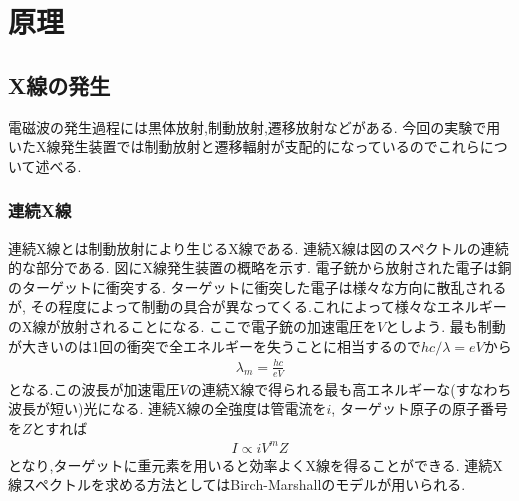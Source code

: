 \section{原理}
\subsection{X線の発生}
電磁波の発生過程には黒体放射,制動放射,遷移放射などがある.
今回の実験で用いたX線発生装置では制動放射と遷移輻射が支配的になっているのでこれらについて述べる.
\subsubsection{連続X線}
連続X線とは制動放射により生じるX線である.
連続X線は図のスペクトルの連続的な部分である.
図にX線発生装置の概略を示す.
電子銃から放射された電子は銅のターゲットに衝突する.
ターゲットに衝突した電子は様々な方向に散乱されるが,
その程度によって制動の具合が異なってくる.これによって様々なエネルギーのX線が放射されることになる.
ここで電子銃の加速電圧を$V$としよう.
最も制動が大きいのは1回の衝突で全エネルギーを失うことに相当するので$hc/\lambda=eV$から
\begin{align}
  \lambda_{m}=\frac{hc}{eV}
\end{align}
となる.この波長が加速電圧$V$の連続X線で得られる最も高エネルギーな(すなわち波長が短い)光になる.
連続X線の全強度は管電流を$i$, ターゲット原子の原子番号を$Z$とすれば
\begin{align}
  I\propto iV^mZ
\end{align}
となり,ターゲットに重元素を用いると効率よくX線を得ることができる.\cite{XrayS}
連続X線スペクトルを求める方法としてはBirch-Marshallのモデルが用いられる.\cite{Xraymodel}
